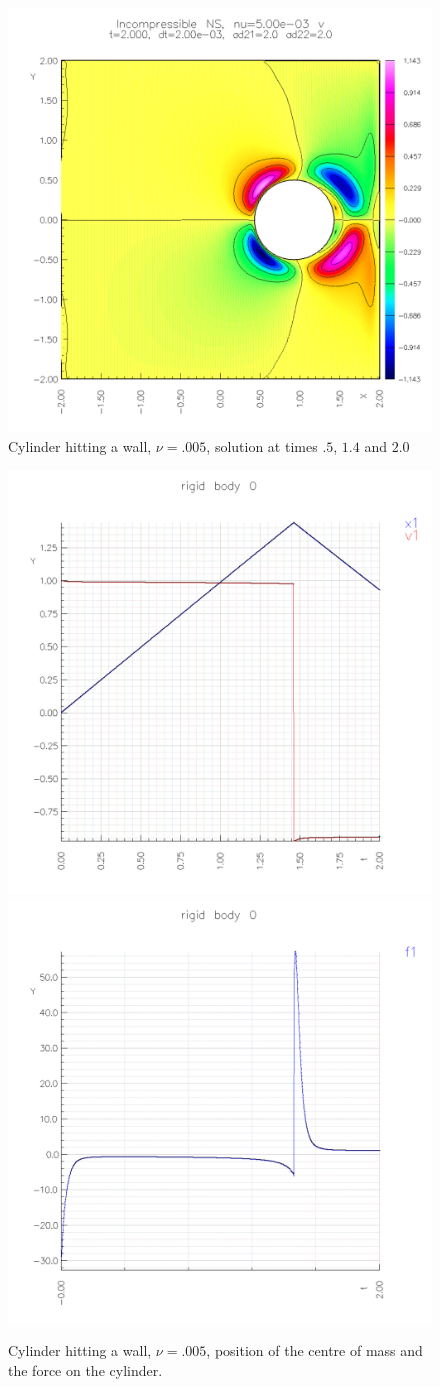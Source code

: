 {\begin{figure}
\begin{center}
\includegraphics[width=\figWidth]{figures/collide6-v-2p0}  
\end{center}
\caption{Cylinder hitting a wall, $\nu=.005$, solution at times $.5$, $1.4$ and $2.0$} 
\end{figure}
}


\begin{figure}
\begin{center}
\includegraphics[width=.45\linewidth]{figures/collide6-rb-x1}  
\includegraphics[width=.45\linewidth]{figures/collide6-rb-f1}  
\end{center}
\caption{Cylinder hitting a wall, $\nu=.005$, position of the centre of mass and the force on the cylinder.}
\end{figure}





